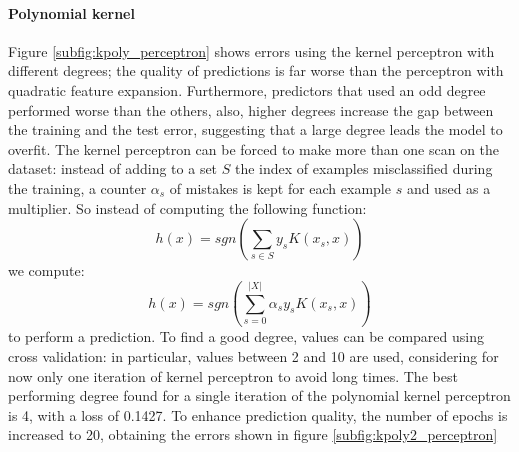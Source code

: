 \documentclass{article}
\begin{document}
\paragraph{Polynomial kernel}
Figure \ref{subfig:kpoly_perceptron} shows errors using the kernel perceptron with different degrees; the quality of predictions is far worse than the perceptron with quadratic feature expansion. Furthermore, predictors that used an odd degree performed worse than the others, also, higher degrees increase the gap between the training and the test error, suggesting that a large degree leads the model to overfit. The kernel perceptron can be forced to make more than one scan on the dataset: instead of adding to a set $S$ the index of examples misclassified during the training, a counter $\alpha_s$ of mistakes is kept for each example $s$ and used as a multiplier. So instead of computing the following function:
\begin{equation}
	h(x) = sgn\left(\sum_{s\in S} y_s K(x_s, x) \right)
\end{equation}
we compute:
\begin{equation}
	h(x) = sgn\left(\sum_{s=0}^{|X|} \alpha_s y_s K(x_s,x)\right)
\end{equation}
to perform a prediction. To find a good degree, values can be compared using cross validation: in particular, values between 2 and 10 are used, considering for now only one iteration of kernel perceptron to avoid long times. The best performing degree found for a single iteration of the polynomial kernel perceptron is 4, with a loss of 0.1427. To enhance prediction quality, the number of epochs is increased to 20, obtaining the errors shown in figure \ref{subfig:kpoly2_perceptron}
\end{document}
